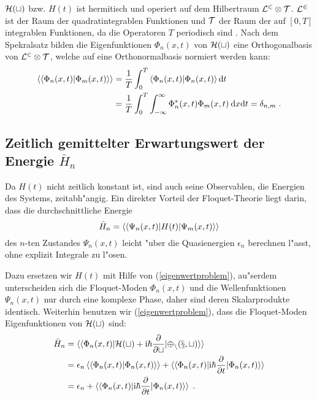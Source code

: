   $\cal{H}(t)$ bzw. $H(t)$ ist hermitisch und operiert auf dem Hilbertraum $\cal{L}^2 \otimes \cal{T}$.
  $\cal{L}^2$ ist der Raum der quadratintegrablen Funktionen und $\cal{T}$ der Raum der auf $[0,T]$ integrablen Funktionen, da die Operatoren $T$ periodisch sind \cite{haenggi}.
  Nach dem Spekralsatz bilden die Eigenfunktionen $\Phi_n(x,t)$ von $\cal{H}(t)$ eine Orthogonalbasis von $\cal{L}^2 \otimes \cal{T}$, welche auf eine Orthonormalbasis normiert werden kann:
  \begin{align}
    \begin{split}
    \braket{\braket{\Phi_n(x,t)|\Phi_m(x,t)}} &= \frac{1}{T} \int_0^T \braket{\Phi_n(x,t)|\Phi_n(x,t)} \text{d}t \\
    &= \frac{1}{T} \int_0^T \int_{-\infty}^{\infty} \Phi_n^*(x,t)\Phi_m(x,t) \: \text{d}x\text{d}t = \delta_{n,m} \; .
    \label{skalarprodukt_einzelner}
    \end{split}
  \end{align}



  \subsection{\texorpdfstring{Zeitlich gemittelter Erwartungswert der Energie $\bar{H}_n$}{Zeitlich gemittelter Erwartungswert der Energie bar{H}_n}}

    Da $H(t)$ nicht zeitlich konstant ist, sind auch seine Observablen, die Energien des Systems, zeitabh"angig.
    Ein direkter Vorteil der Floquet-Theorie liegt darin, dass die durchschnittliche Energie
    \begin{equation}
      \bar{H}_n  = \braket{\braket{\Psi_n(x,t)|H(t)|\Psi_m(x,t)}}
    \end{equation}
    des $n$-ten Zustandes $\Psi_n(x,t)$ leicht "uber die Quasienergien $\epsilon_n$ berechnen l"asst, ohne explizit Integrale zu l"osen.

    Dazu ersetzen wir $H(t)$ mit Hilfe von (\ref{eigenwertproblem}), au"serdem unterscheiden sich die Floquet-Moden $\Phi_n(x,t)$ und die Wellenfunktionen $\Psi_n(x,t)$ nur durch eine komplexe Phase, daher sind deren Skalarprodukte identisch.
    Weiterhin benutzen wir (\ref{eigenwertproblem}), dass die Floquet-Moden Eigenfunktionen von $\cal{H}(t)$ sind:
    \begin{align}
      \begin{split}
      \bar{H}_n  &= \braket{\braket{\Phi_n(x,t)|\cal{H}(t)+\text{i}\hbar\frac{\partial}{\partial t}|\Phi_n(x,t)}} \\
      &=\epsilon_n \braket{\braket{\Phi_n(x,t)|\Phi_n(x,t)}} + \braket{\braket{\Phi_n(x,t)|\text{i}\hbar\frac{\partial}{\partial t}|\Phi_n(x,t)}} \\
      &= \epsilon_n + \braket{\braket{\Phi_n(x,t)|\text{i}\hbar\frac{\partial}{\partial t}|\Phi_n(x,t)}} \; .
    \end{split}
    \end{align}

